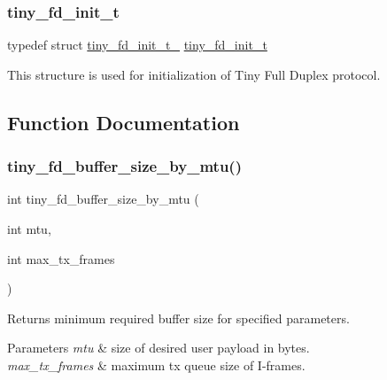 \subsubsection{\texorpdfstring{tiny\+\_\+fd\+\_\+init\+\_\+t}{tiny\_fd\_init\_t}}
{\footnotesize\ttfamily typedef struct \hyperlink{structtiny__fd__init__t__}{tiny\+\_\+fd\+\_\+init\+\_\+t\+\_\+}  \hyperlink{group__FULL__DUPLEX__API_gad19ac27f4ba1d2b807e0a440b0c927d2}{tiny\+\_\+fd\+\_\+init\+\_\+t}}

This structure is used for initialization of Tiny Full Duplex protocol. 

\subsection{Function Documentation}
\mbox{\label{group__FULL__DUPLEX__API_ga19789bea5b5acd68804773f0d6b0e3f7}} 
\subsubsection{\texorpdfstring{tiny\+\_\+fd\+\_\+buffer\+\_\+size\+\_\+by\+\_\+mtu()}{tiny\_fd\_buffer\_size\_by\_mtu()}}
{\footnotesize\ttfamily int tiny\+\_\+fd\+\_\+buffer\+\_\+size\+\_\+by\+\_\+mtu (\begin{DoxyParamCaption}\item[{int}]{mtu,  }\item[{int}]{max\+\_\+tx\+\_\+frames }\end{DoxyParamCaption})}

Returns minimum required buffer size for specified parameters. 
\begin{DoxyParams}{Parameters}
{\em mtu} & size of desired user payload in bytes. \\
\hline
{\em max\+\_\+tx\+\_\+frames} & maximum tx queue size of I-\/frames. \\
\hline
\end{DoxyParams}
\mbox{\label{group__FULL__DUPLEX__API_ga11e470503e3359bc29a5bcb65a9771d5}} 
